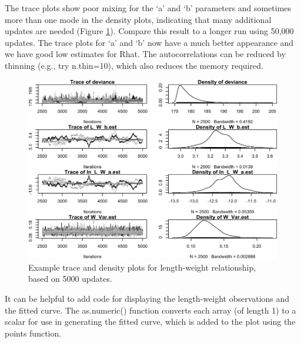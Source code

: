 \documentclass[
]{krantz}
\begin{document}
The trace plots show poor mixing for the `a' and `b' parameters and sometimes more than one mode in the density plots, indicating that many additional updates are needed (Figure \ref{fig:LnWtPlot}). Compare this result to a longer run using 50,000 updates. The trace plots for `a' and `b' now have a much better appearance and we have good low estimates for Rhat. The autocorrelations can be reduced by thinning (e.g., try n.thin=10), which also reduces the memory required.

\begin{figure}
\includegraphics[width=0.9\linewidth]{bookdown_files/figure-latex/LnWtPlot-1} \caption{Example trace and density plots for length-weight relationship, based on 5000 updates.}\label{fig:LnWtPlot}
\end{figure}

It can be helpful to add code for displaying the length-weight observations and the fitted curve. The as.numeric() function converts each array (of length 1) to a scalar for use in generating the fitted curve, which is added to the plot using the points function.
\end{document}
